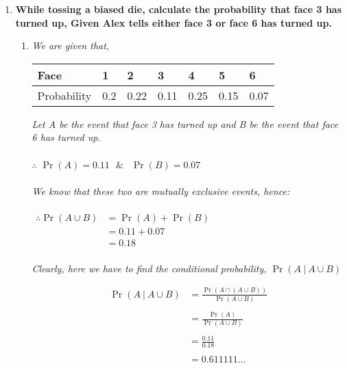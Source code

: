 \documentclass{article}
\begin{document}
\begin{enumerate}
\item \textbf{While tossing a biased die, calculate the probability that
face 3 has turned up, Given Alex tells either face 3 or face 6 has turned up.}

\begin{enumerate}
  \item\textit{We are given that,}
        \begin{center}
        \begin{tabular}{ | m{5em} | m{1cm}| m{1cm} | m{1cm} | m{1cm} | m{1cm} | m{1cm} | }
        \hline
        Face & 1 & 2 & 3 & 4 & 5 & 6\\
        \hline
        Probability & 0.2 & 0.22 & 0.11 & 0.25 & 0.15 & 0.07\\
        \hline
        \end{tabular}
        \end{center}

        \textit{Let A be the event that face 3 has turned up and B be the event that face 6 has turned up.}\\\\
        $\therefore $ $\Pr(A) = 0.11\ \ \ \&\ \ $ $\Pr(B) = 0.07$\\\\
        \textit{We know that these two are mutually exclusive events, hence:}\\\\
        $\begin{aligned}
        \therefore \Pr(A \cup B) & = \Pr(A) + \Pr(B)\\
        & = 0.11 + 0.07 \\
        & = 0.18
        \end{aligned}$\\\\
        \textit{Clearly, here we have to find the conditional probability, $\Pr(A \ |\ A \cup B)$}

        \begin{align*}
        \Pr(A \ |\ A \cup B) & = \frac{\Pr(A \cap (A \cup B))}{\Pr(A \cup B)}\\\\
        & = \frac{\Pr(A)}{\Pr(A \cup B)}\\\\
        & = \frac{0.11}{0.18}\\\\
        & = 0.611111...
        \end{align*}


\end{enumerate}
\end{enumerate}
\end{document}
